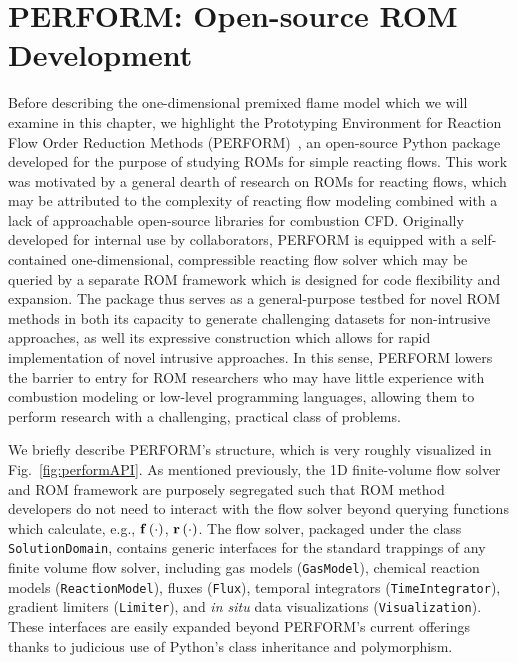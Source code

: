 \section{PERFORM: Open-source ROM Development}

Before describing the one-dimensional premixed flame model which we will examine in this chapter, we highlight the Prototyping Environment for Reaction Flow Order Reduction Methods (PERFORM)~\cite{Wentland2022}, an open-source Python package developed for the purpose of studying ROMs for simple reacting flows. This work was motivated by a general dearth of research on ROMs for reacting flows, which may be attributed to the complexity of reacting flow modeling combined with a lack of approachable open-source libraries for combustion CFD. Originally developed for internal use by collaborators, PERFORM is equipped with a self-contained one-dimensional, compressible reacting flow solver which may be queried by a separate ROM framework which is designed for code flexibility and expansion. The package thus serves as a general-purpose testbed for novel ROM methods in both its capacity to generate challenging datasets for non-intrusive approaches, as well its expressive construction which allows for rapid implementation of novel intrusive approaches.  In this sense, PERFORM lowers the barrier to entry for ROM researchers who may have little experience with combustion modeling or low-level programming languages, allowing them to perform research with a challenging, practical class of problems.

We briefly describe PERFORM's structure, which is very roughly visualized in Fig.~\ref{fig:performAPI}. As mentioned previously, the 1D finite-volume flow solver and ROM framework are purposely segregated such that ROM method developers do not need to interact with the flow solver beyond querying functions which calculate, e.g., $\mathbf{f} \left(\cdot\right)$, $\mathbf{r}\left(\cdot\right)$. The flow solver, packaged under the class \texttt{SolutionDomain}, contains generic interfaces for the standard trappings of any finite volume flow solver, including gas models (\texttt{GasModel}), chemical reaction models (\texttt{ReactionModel}), fluxes (\texttt{Flux}), temporal integrators (\texttt{TimeIntegrator}), gradient limiters (\texttt{Limiter}), and \textit{in situ} data visualizations (\texttt{Visualization}). These interfaces are easily expanded beyond PERFORM's current offerings thanks to judicious use of Python's class inheritance and polymorphism.

